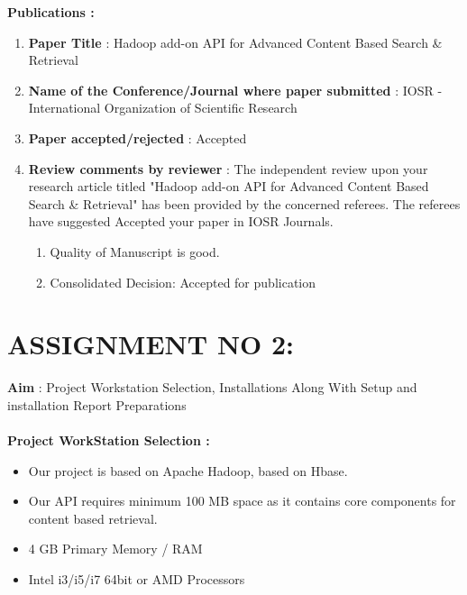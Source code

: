 \documentclass[oneside,a4paper,12pt]{report}
\begin{document}
{\begin{appendices}
\noindent \textbf{Publications :} \\

\begin{enumerate}
\item \textbf{Paper Title } : Hadoop add-on API for Advanced Content Based Search \& Retrieval 
\item \textbf{Name of the Conference/Journal where paper submitted } : IOSR - International Organization of Scientific Research
\item \textbf{Paper accepted/rejected } : Accepted
\item \textbf{Review comments by reviewer} : The independent review upon your research article titled "Hadoop add-on API for Advanced Content Based Search \& Retrieval" has been provided by the concerned referees. The referees have suggested Accepted your paper in IOSR Journals.
	\begin{enumerate}
		\item Quality of Manuscript is good.
		\item Consolidated Decision: Accepted for publication 
	\end{enumerate}
	
\end{enumerate}

\pagebreak

\section{ASSIGNMENT NO 2: }

\textbf{Aim} : Project Workstation Selection, Installations Along With Setup and installation Report Preparations \\\\

\noindent \textbf{Project WorkStation Selection : } 
\begin{itemize}
\item Our project is based on Apache Hadoop, based on Hbase. 
\item Our API requires minimum 100 MB space as it contains core components for content based retrieval.
\item 4 GB Primary Memory / RAM
\item Intel i3/i5/i7 64bit or AMD Processors
\end{itemize}



\end{appendices}}
\end{document}
